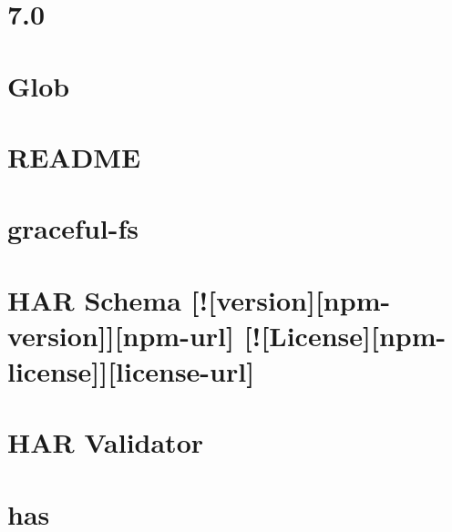\documentclass[twoside]{book}
\newcommand{\+}{\discretionary{\mbox{\scriptsize$\hookleftarrow$}}{}{}}
\begin{document}
\chapter{7.0}
\label{md_dsmacc_examples_DRmerge_node_modules_glob_changelog}

\chapter{Glob}
\label{md_dsmacc_examples_DRmerge_node_modules_glob_README}

\chapter{R\+E\+A\+D\+ME}
\label{md_dsmacc_examples_DRmerge_node_modules_glob-parent_README}

\chapter{graceful-\/fs}
\label{md_dsmacc_examples_DRmerge_node_modules_graceful-fs_README}

\chapter{H\+AR Schema \mbox{[}!\mbox{[}version\mbox{]}\mbox{[}npm-\/version\mbox{]}\mbox{]}\mbox{[}npm-\/url\mbox{]} \mbox{[}!\mbox{[}License\mbox{]}\mbox{[}npm-\/license\mbox{]}\mbox{]}\mbox{[}license-\/url\mbox{]}}
\label{md_dsmacc_examples_DRmerge_node_modules_har-schema_README}

\chapter{H\+AR Validator}
\label{md_dsmacc_examples_DRmerge_node_modules_har-validator_README}

\chapter{has}
\label{md_dsmacc_examples_DRmerge_node_modules_has_README}

\end{document}
